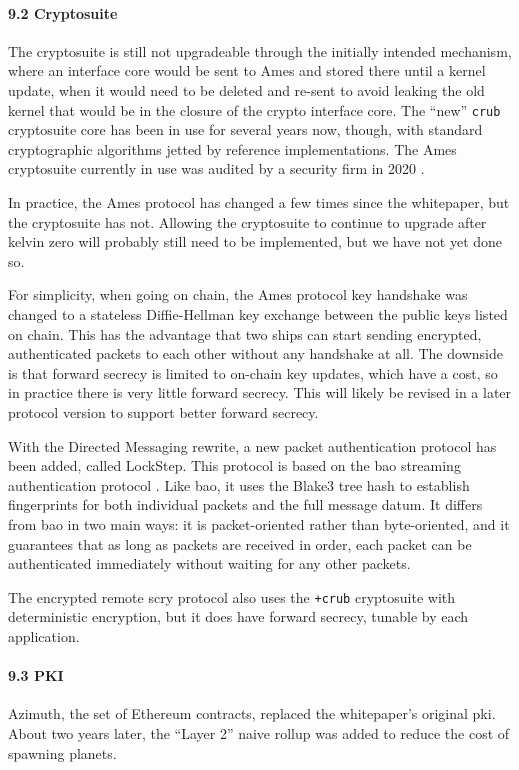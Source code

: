 \documentclass[twoside]{article}
\begin{document}
\paragraph{9.2 Cryptosuite}

The cryptosuite is still not upgradeable through the initially intended mechanism, where an interface core would be sent to Ames and stored there until a kernel update, when it would need to be deleted and re-sent to avoid leaking the old kernel that would be in the closure of the crypto interface core.  The ``new'' \lstinline[style=inlinecode]{crub} cryptosuite core has been in use for several years now, though, with standard cryptographic algorithms jetted by reference implementations.  The Ames cryptosuite currently in use was audited by a security firm in 2020 \citep{AmesAudit}.

In practice, the Ames protocol has changed a few times since the whitepaper, but the cryptosuite has not.  Allowing the cryptosuite to continue to upgrade after kelvin zero will probably still need to be implemented, but we have not yet done so.

For simplicity, when going on chain, the Ames protocol key handshake was changed to a stateless Diffie-Hellman key exchange between the public keys listed on chain.  This has the advantage that two ships can start sending encrypted, authenticated packets to each other without any handshake at all.  The downside is that forward secrecy is limited to on-chain key updates, which have a cost, so in practice there is very little forward secrecy.  This will likely be revised in a later protocol version to support better forward secrecy.

With the Directed Messaging rewrite, a new packet authentication protocol has been added, called LockStep.  This protocol is based on the {\sc bao} streaming authentication protocol \citep{BAO}.  Like {\sc bao}, it uses the Blake3 tree hash to establish fingerprints for both individual packets and the full message datum.  It differs from {\sc bao} in two main ways: it is packet-oriented rather than byte-oriented, and it guarantees that as long as packets are received in order, each packet can be authenticated immediately without waiting for any other packets.

The encrypted remote scry protocol also uses the \lstinline[style=inlinecode]{+crub} cryptosuite with deterministic encryption, but it does have forward secrecy, tunable by each application.

\paragraph{9.3 PKI}  Azimuth, the set of Ethereum contracts, replaced the whitepaper's original {\sc pki}.  About two years later, the ``Layer 2'' naive rollup was added to reduce the cost of spawning planets.
\end{document}
